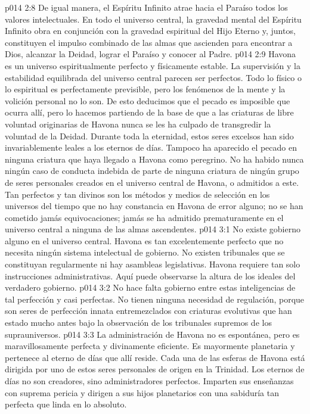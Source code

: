 \vs p014 2:8 De igual manera, el Espíritu Infinito atrae hacia el Paraíso todos los valores intelectuales. En todo el universo central, la gravedad mental del Espíritu Infinito obra en conjunción con la gravedad espiritual del Hijo Eterno y, juntos, constituyen el impulso combinado de las almas que ascienden para encontrar a Dios, alcanzar la Deidad, lograr el Paraíso y conocer al Padre.
\vs p014 2:9 \pc Havona es un universo espiritualmente perfecto y físicamente estable. La supervisión y la estabilidad equilibrada del universo central parecen ser perfectos. Todo lo físico o lo espiritual es perfectamente previsible, pero los fenómenos de la mente y la volición personal no lo son. De esto deducimos que el pecado es imposible que ocurra allí, pero lo hacemos partiendo de la base de que a las criaturas de libre voluntad originarias de Havona nunca se les ha culpado de transgredir la voluntad de la Deidad. Durante toda la eternidad, estos seres excelsos han sido invariablemente leales a los eternos de días. Tampoco ha aparecido el pecado en ninguna criatura que haya llegado a Havona como peregrino. No ha habido nunca ningún caso de conducta indebida de parte de ninguna criatura de ningún grupo de seres personales creados en el universo central de Havona, o admitidos a este. Tan perfectos y tan divinos son los métodos y medios de selección en los universos del tiempo que no hay constancia en Havona de error alguno; no se han cometido jamás equivocaciones; jamás se ha admitido prematuramente en el universo central a ninguna de las almas ascendentes.
\vs p014 3:1 No existe gobierno alguno en el universo central. Havona es tan excelentemente perfecto que no necesita ningún sistema intelectual de gobierno. No existen tribunales que se constituyan regularmente ni hay asambleas legislativas. Havona requiere tan solo instrucciones administrativas. Aquí puede observarse la altura de los ideales del verdadero  gobierno.
\vs p014 3:2 No hace falta gobierno entre estas inteligencias de tal perfección y casi perfectas. No tienen ninguna necesidad de regulación, porque son seres de perfección innata entremezclados con criaturas evolutivas que han estado mucho antes bajo la observación de los tribunales supremos de los suprauniversos.
\vs p014 3:3 La administración de Havona no es espontánea, pero es maravillosamente perfecta y divinamente eficiente. Es mayormente planetaria y pertenece al eterno de días que allí reside. Cada una de las esferas de Havona está dirigida por uno de estos seres personales de origen en la Trinidad. Los eternos de días no son creadores, sino administradores perfectos. Imparten sus enseñanzas con suprema pericia y dirigen a sus hijos planetarios con una sabiduría tan perfecta que linda en lo absoluto.

